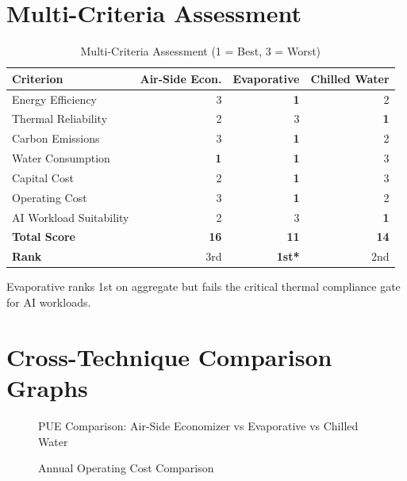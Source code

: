 \documentclass[12pt,a4paper]{report}
\begin{document}
\section{Multi-Criteria Assessment}

\begin{table}[H]
\centering
\caption{Multi-Criteria Assessment (1 = Best, 3 = Worst)}
\label{tab:radar}
\renewcommand{\arraystretch}{1.4}
\begin{tabular}{lrrr}
\toprule
\textbf{Criterion} & \textbf{Air-Side Econ.} & \textbf{Evaporative} & \textbf{Chilled Water} \\
\midrule
Energy Efficiency & 3 & \textbf{1} & 2 \\
Thermal Reliability & 2 & 3 & \textbf{1} \\
Carbon Emissions & 3 & \textbf{1} & 2 \\
Water Consumption & \textbf{1} & \textbf{1} & 3 \\
Capital Cost & 2 & \textbf{1} & 3 \\
Operating Cost & 3 & \textbf{1} & 2 \\
AI Workload Suitability & 2 & 3 & \textbf{1} \\
\midrule
\textbf{Total Score} & \textbf{16} & \textbf{11} & \textbf{14} \\
\textbf{Rank} & 3rd & \textbf{1st*} & 2nd \\
\bottomrule
\end{tabular}
\end{table}

\noindent *Evaporative ranks 1st on aggregate but fails the critical thermal compliance gate for AI workloads.

\section{Cross-Technique Comparison Graphs}

\begin{figure}[H]
\centering
{}
\caption{PUE Comparison: Air-Side Economizer vs Evaporative vs Chilled Water}
\label{fig:compare_pue}
\end{figure}

\begin{figure}[H]
\centering
{}
\caption{Annual Operating Cost Comparison}
\label{fig:compare_cost}
\end{figure}
\end{document}
